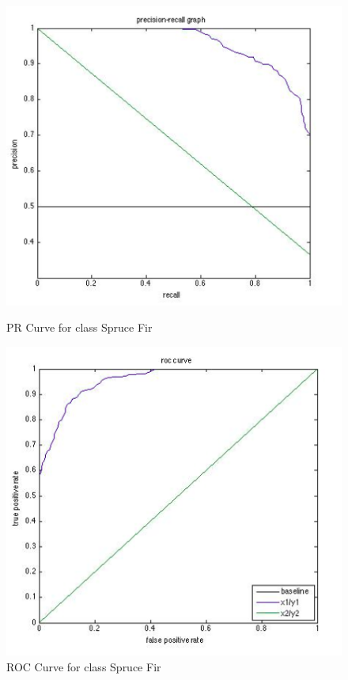 \documentclass[11pt]{article}
\begin{document}
\begin{figure}[htbp]
\begin{minipage}[b]{0.5\linewidth}
\centering
\includegraphics[width=\linewidth]{SpruceFirPRCurve.png}
\caption{PR Curve for class Spruce Fir}
\label{fig:chapter001_dist_001}
\end{minipage}
\hspace{0.5cm}
\begin{minipage}[b]{0.5\linewidth}
\centering
\includegraphics[width=\linewidth]{SpruceFirROCCurve.png}
\caption{ROC Curve for class Spruce Fir}
\label{fig:chapter001_reward_001}
\end{minipage}
\end{figure}
\end{document}
